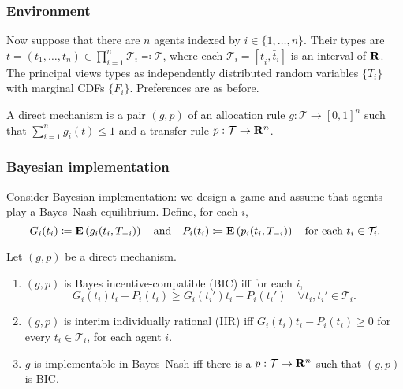 \documentclass[11pt,letterpaper,reqno,oneside]{article}
\begin{document}
\subsubsection{Environment}
\label{sec:mech_desi:several_agents_one_dimension:environment}

Now suppose that there are $n$ agents indexed by $i \in \{1,\dots,n\}$. Their types are $t = (t_1,\dots,t_n) \in \prod_{i=1}^n \mathcal{T}_i \eqqcolon \mathcal{T}$, where each $\mathcal{T}_i = \left[ \underline{t}_i, \bar{t}_i \right]$ is an interval of $\mathbf{R}$. The principal views types as independently distributed random variables $\{ T_i \}$ with marginal CDFs $\{ F_i \}$. Preferences are as before.

A direct mechanism is a pair $(g,p)$ of an allocation rule $g : \mathcal{T} \to [0,1]^n$ such that $\sum_{i=1}^n g_i(t) \leq 1$ and a transfer rule $p : \mathcal{T} \to \mathbf{R}^n$.



\subsubsection{Bayesian implementation}
\label{sec:mech_desi:several_agents_one_dimension:BIC_characterisation}

Consider Bayesian implementation: we design a game and assume that agents play a Bayes--Nash equilibrium. Define, for each $i$,
%
\begin{equation*}
	G_i(t_i) \coloneqq
	\mathbf{E}\left( g_i(t_i,T_{-i}) \right)
	\quad\text{and}\quad
	P_i(t_i) \coloneqq
	\mathbf{E}\left( p_i(t_i,T_{-i}) \right) 
	\quad\text{for each $t_i \in \mathcal{T}_i$} .
\end{equation*}


\begin{definition}
	Let $(g,p)$ be a direct mechanism.
	\begin{enumerate}

		\item $(g,p)$ is Bayes incentive-compatible (BIC) iff for each $i$,
		\begin{equation*}
			G_i(t_i) t_i - P_i(t_i) \geq G_i(t_i') t_i - P_i(t_i')
			\quad\forall t_i,t_i' \in \mathcal{T}_i .
		\end{equation*}

		\item $(g,p)$ is interim individually rational (IIR) iff $G_i(t_i) t_i - P_i(t_i) \geq 0$ for every $t_i \in \mathcal{T}_i$, for each agent $i$.

		\item $g$ is implementable in Bayes--Nash iff there is a $p : \mathcal{T} \to \mathbf{R}^n$ such that $(g,p)$ is BIC.

	\end{enumerate}
\end{definition}
\end{document}
